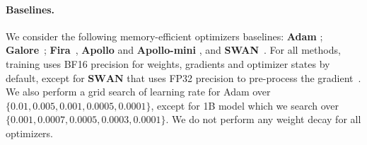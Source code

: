 \paragraph{Baselines.} We consider the following memory-efficient optimizers baselines: \textbf{Adam} \citep{adam};  \textbf{Galore}~\cite{Zhao2024GaLoreML}; \textbf{Fira}~\cite{chen2024firaachievefullranktraining}, \textbf{Apollo} and \textbf{Apollo-mini} \cite{zhu2024apollo}, and  \textbf{SWAN}~\cite{ma2024swansgdnormalizationwhitening}. For all methods, training uses BF16 precision for weights, gradients and optimizer states by default, except for $\textbf{SWAN}$ that uses FP32 precision to pre-process the gradient~\cite{ma2024swansgdnormalizationwhitening}. We also perform a grid search of learning rate for Adam over $\{0.01, 0.005, 0.001, 0.0005, 0.0001\}$, except for 1B model which we search over $\{ 0.001, 0.0007, 0.0005, 0.0003, 0.0001\}$. We do not perform any weight decay for all optimizers. 

